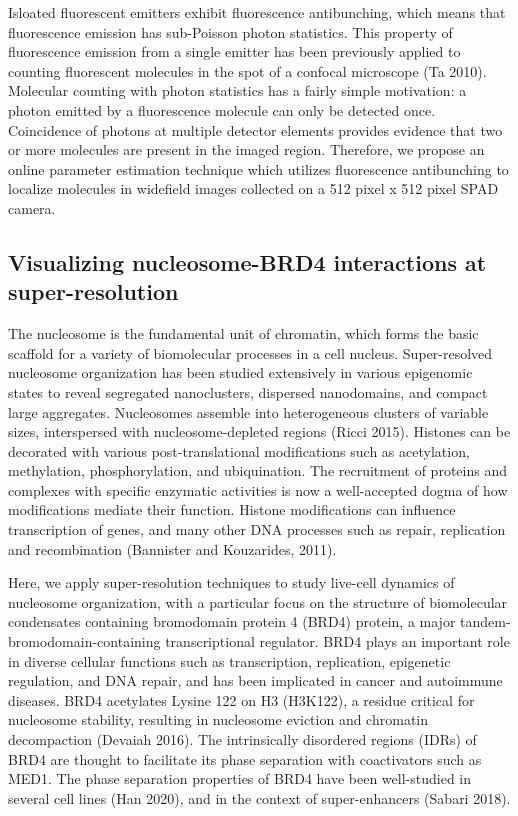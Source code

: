 \documentclass{ucetd}
\begin{document}
Isloated fluorescent emitters exhibit fluorescence antibunching, which means that fluorescence emission has sub-Poisson photon statistics. This property of fluorescence emission from a single emitter has been previously applied to counting fluorescent molecules in the spot of a confocal microscope (Ta 2010). Molecular counting with photon statistics has a fairly simple motivation: a photon emitted by a fluorescence molecule can only be detected once. Coincidence of photons at multiple detector elements provides evidence that two or more molecules are present in the imaged region. Therefore, we propose an online parameter estimation technique which utilizes fluorescence antibunching to localize molecules in widefield images collected on a 512 pixel x 512 pixel SPAD camera.

\subsection{Visualizing nucleosome-BRD4 interactions at super-resolution}

The nucleosome is the fundamental unit of chromatin, which forms the basic scaffold for a variety of biomolecular processes in a cell nucleus. Super-resolved nucleosome organization has been studied extensively in various epigenomic states to reveal segregated nanoclusters, dispersed nanodomains, and compact large aggregates. Nucleosomes assemble into heterogeneous clusters of variable sizes, interspersed with nucleosome-depleted regions (Ricci 2015). Histones can be decorated with various post-translational modifications such as acetylation, methylation, phosphorylation, and ubiquination. The recruitment of proteins and complexes with specific enzymatic activities is now a well-accepted dogma of how modifications mediate their function. Histone modifications can influence transcription of genes, and many other DNA processes such as repair, replication and recombination (Bannister and Kouzarides, 2011). 

Here, we apply super-resolution techniques to study live-cell dynamics of nucleosome organization, with a particular focus on the structure of biomolecular condensates containing bromodomain protein 4 (BRD4) protein, a major tandem-bromodomain-containing transcriptional regulator. BRD4 plays an important role in diverse cellular functions such as transcription, replication, epigenetic regulation, and DNA repair, and has been implicated in cancer and autoimmune diseases. BRD4 acetylates Lysine 122 on H3 (H3K122), a residue critical for nucleosome stability, resulting in nucleosome eviction and chromatin decompaction (Devaiah 2016). The intrinsically disordered regions (IDRs) of BRD4 are thought to facilitate its phase separation with coactivators such as MED1. The phase separation properties of BRD4 have been well-studied in several cell lines (Han 2020), and in the context of super-enhancers (Sabari 2018).
\end{document}
